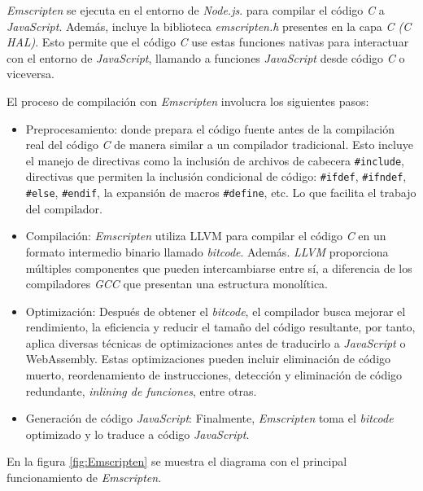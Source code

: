 \textit{Emscripten} se ejecuta en el entorno de \textit{Node.js}. para compilar el código \textit{C} a \textit{JavaScript}. Además, incluye la biblioteca \textit{emscripten.h} presentes en la capa \textit{C (C HAL)}. Esto permite que el código \textit{C} use estas funciones nativas para interactuar con el entorno de \textit{JavaScript}, llamando a funciones \textit{JavaScript} desde código \textit{C} o viceversa.

El proceso de compilación con \textit{Emscripten} involucra los siguientes pasos:

\begin{itemize}
	\item Preprocesamiento: donde prepara el código fuente antes de la compilación real del código \textit{C} de manera similar a un compilador tradicional. Esto incluye el manejo de directivas como la inclusión de archivos de cabecera \texttt{\#include}, directivas que permiten la inclusión condicional de código: \newline \texttt{\#ifdef}, \texttt{\#ifndef}, \texttt{\#else}, \texttt{\#endif}, la expansión de macros \texttt{\#define}, etc. Lo que facilita el trabajo del compilador.
	
	\item Compilación: \textit{Emscripten} utiliza LLVM para compilar el código \textit{C} en un formato intermedio binario llamado  \textit{bitcode}. 
Además. \textit{LLVM} proporciona múltiples componentes que pueden intercambiarse entre sí, a diferencia de los compiladores \textit{GCC} que presentan una estructura monolítica. 

	\item Optimización: Después de obtener el \textit{bitcode}, el compilador busca mejorar el rendimiento, la eficiencia y reducir el tamaño del código resultante, por tanto,  aplica diversas técnicas de optimizaciones antes de traducirlo a \textit{JavaScript} o WebAssembly. Estas optimizaciones pueden incluir eliminación de código muerto, reordenamiento de instrucciones, detección y eliminación de código redundante, \textit{inlining de funciones}, entre otras.
	
	\item Generación de código \textit{JavaScript}: Finalmente, \textit{Emscripten} toma el \textit{bitcode} optimizado y lo traduce a código \textit{JavaScript}.

\end{itemize}


En la figura \ref{fig:Emscripten} se muestra el diagrama con el principal funcionamiento de \textit{Emscripten}. 
\hfill \break

